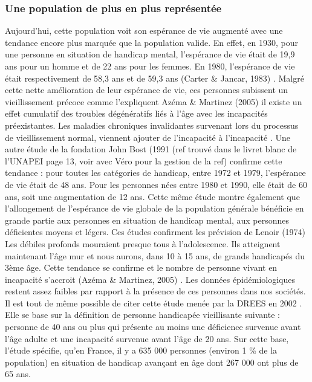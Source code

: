 \subsubsection{Une population de plus en plus représentée}

Aujourd'hui, cette population voit son espérance de vie augmenté avec une tendance encore plus marquée que la population valide. En effet, en 1930, pour une personne en situation de handicap mental, l'espérance de vie était de 19,9 ans pour un homme et de 22 ans pour les femmes. En 1980, l'espérance de vie était respectivement de 58,3 ans et de 59,3 ans (Carter \& Jancar, 1983) \cite{CarterJancar1983}. Malgré cette nette amélioration de leur espérance de vie, ces personnes subissent un vieillissement précoce comme l'expliquent Azéma \& Martinez (2005) \cite{AzemaMartinez2005} \og il existe un effet cumulatif des troubles dégénératifs liés à l’âge avec les incapacités préexistantes. Les maladies chroniques invalidantes survenant lors du processus de vieillissement normal, viennent \og ajouter de l’incapacité à l’incapacité\fg{} \fg{} . Une autre étude de la fondation John Bost (1991 (ref trouvé dans le livret blanc de l'UNAPEI page 13, voir avec Véro pour la gestion de la ref) \cite{Gabbai2010} confirme cette tendance : pour toutes les catégories de handicap, entre 1972 et 1979, l'espérance de vie était de 48 ans. Pour les personnes nées entre 1980 et 1990, elle était de 60 ans, soit une augmentation de 12 ans. Cette même étude montre également que l'allongement de l'espérance de vie globale de la population générale bénéficie en grande partie aux personnes en situation de handicap mental, aux personnes déficientes moyens et légers. Ces études confirment les prévision de Lenoir (1974) \cite{Lenoir1974} \og Les débiles profonds mouraient presque tous à l’adolescence. Ils atteignent maintenant l’âge mur et nous aurons, dans 10 à 15 ans, de grands handicapés du 3ème âge\fg . Cette tendance se confirme et le nombre de personne vivant en incapacité s'accroit (Azéma \& Martinez, 2005) \cite{AzemaMartinez2005}. Les données épidémiologiques restent assez faibles par rapport à la présence de ces personnes dans nos sociétés. Il est tout de même possible de citer cette étude menée par la DREES en 2002 \cite{Drees2002}. Elle se base sur la définition de personne handicapée vieillisante suivante : \og personne de 40 ans ou plus qui présente au moins une déficience survenue avant l'âge adulte et une incapacité survenue avant l'âge de 20 ans\fg{}. Sur cette base, l'étude spécifie, qu'en France, il y a 635 000 personnes (environ 1 \% de la population) en situation de handicap avançant en âge dont 267 000 ont plus de 65 ans.
